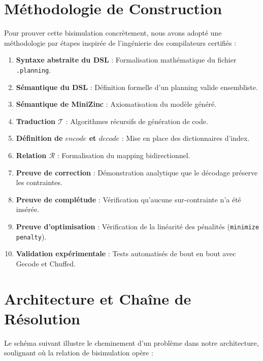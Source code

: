 \documentclass[12pt,a4paper]{article}
\begin{document}
\section{Méthodologie de Construction}
Pour prouver cette bisimulation concrètement, nous avons adopté une méthodologie par étapes inspirée de l'ingénierie des compilateurs certifiés \cite{leroy2009formal, schneider2006inductive} :
\begin{enumerate}
    \item \textbf{Syntaxe abstraite du DSL} : Formalisation mathématique du fichier \texttt{.planning}.
    \item \textbf{Sémantique du DSL} : Définition formelle d'un planning valide ensembliste.
    \item \textbf{Sémantique de MiniZinc} : Axiomatisation du modèle généré.
    \item \textbf{Traduction $\mathcal{T}$} : Algorithmes récursifs de génération de code.
    \item \textbf{Définition de $encode$ et $decode$} : Mise en place des dictionnaires d'index.
    \item \textbf{Relation $\mathcal{R}$} : Formalisation du mapping bidirectionnel.
    \item \textbf{Preuve de correction} : Démonstration analytique que le décodage préserve les contraintes.
    \item \textbf{Preuve de complétude} : Vérification qu'aucune sur-contrainte n'a été insérée.
    \item \textbf{Preuve d'optimisation} : Vérification de la linéarité des pénalités (\texttt{minimize penalty}).
    \item \textbf{Validation expérimentale} : Tests automatisés de bout en bout avec Gecode et Chuffed.
\end{enumerate}

\section{Architecture et Chaîne de Résolution}
Le schéma suivant illustre le cheminement d'un problème dans notre architecture, soulignant où la relation de bisimulation opère :
\end{document}

